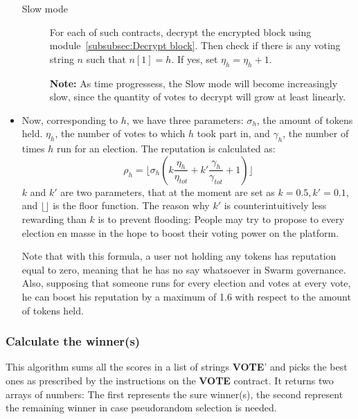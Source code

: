 \documentclass[submission, copyright,creativecommons,sharealike,noncommercial]{eptcs}
\newcommand{\Vote}{\textbf{VOTE}\xspace}
\begin{document}
\begin{itemize}
\begin{description}
			\item[Slow mode] For each of such contracts, decrypt the encrypted block using module~\ref{subsubsec:Decrypt block}. Then check if there is any voting string $n$ such that $n[1]=h$. If yes, set $\eta_{h} = \eta_{h}+1$.
			
			\textbf{Note:} As time progressess, the Slow mode will become increasingly slow, since the quantity of votes to decrypt will grow at least linearly.
		\end{description}

		\item Now, corresponding to $h$, we have three parameters: $\sigma_h$, the amount of tokens held. $\eta_h$, the number of votes to which $h$ took part in, and $\gamma_h$, the number of times $h$ run for an election. The reputation is calculated as:
		\[
		\rho_h = \Big\lfloor \sigma_h\left( k \frac{\eta_h}{\eta_{tot}} + k' \frac{\gamma_h}{\gamma_{tot}} + 1\right) \Big\rfloor
		\]
		$k$ and $k'$ are two parameters, that at the moment are set as $k=0.5, k'=0.1$, and $\lfloor \rfloor$ is the floor function. The reason why $k'$ is counterintuitively less rewarding than $k$ is to prevent flooding: People may try to propose to every election en masse in the hope to boost their voting power on the platform. 
		
		Note that with this formula, a user not holding any tokens has reputation equal to zero, meaning that he has no say whatsoever in Swarm governance. Also, supposing that someone runs for every election and votes at every vote, he can boost his reputation by a maximum of 1.6 with respect to the amount of tokens held.
	\end{itemize}

\subsubsection{Calculate the winner(s)}\label{subsubsec:Get winner}
	This algorithm sums all the scores in a list of strings \Vote' and picks the best ones as prescribed by the instructions on the \Vote contract. It returns two arrays of numbers: The first represents the sure winner(s), the second represent the remaining winner in case pseudorandom selection is needed.
	
\end{document}
